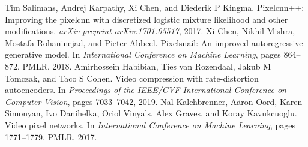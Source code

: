 \begin{chapterreferences}
 Tim Salimans, Andrej Karpathy, Xi Chen, and Diederik P Kingma. Pixelcnn++: Improving the pixelcnn with discretized logistic mixture likelihood and other modifications. \emph{arXiv preprint arXiv:1701.05517}, 2017.
 Xi Chen, Nikhil Mishra, Mostafa Rohaninejad, and Pieter Abbeel. Pixelsnail: An improved autoregressive generative model. In \emph{International Conference on Machine Learning}, pages 864--872. PMLR, 2018.
 Amirhossein Habibian, Ties van Rozendaal, Jakub M Tomczak, and Taco S Cohen. Video compression with rate-distortion autoencoders. In \emph{Proceedings of the IEEE/CVF International Conference on Computer Vision}, pages 7033--7042, 2019.
 Nal Kalchbrenner, Aäron Oord, Karen Simonyan, Ivo Danihelka, Oriol Vinyals, Alex Graves, and Koray Kavukcuoglu. Video pixel networks. In \emph{International Conference on Machine Learning}, pages 1771--1779. PMLR, 2017.


\end{chapterreferences}
